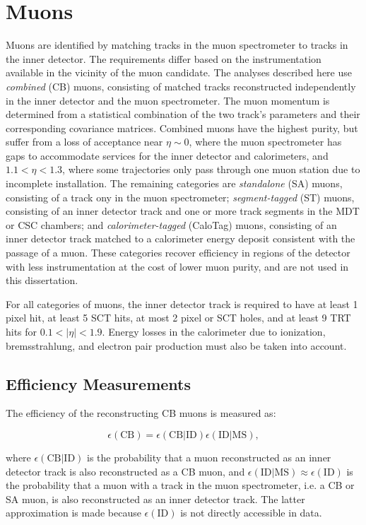 \section{Muons}\label{sec:event-reconstruction-muons}
Muons are identified by matching tracks in the muon spectrometer to tracks in the inner detector. The requirements differ based on the instrumentation available in the vicinity of the muon candidate. The analyses described here use \emph{combined} (CB) muons, consisting of matched tracks reconstructed independently in the inner detector and the muon spectrometer. The muon momentum is determined from a statistical combination of the two track's parameters and their corresponding covariance matrices. Combined muons have the highest purity, but suffer from a loss of acceptance near $\eta\sim 0$, where the muon spectrometer has gaps to accommodate services for the inner detector and calorimeters, and $1.1<\eta<1.3$, where some trajectories only pass through one muon station due to incomplete installation. The remaining categories are \emph{standalone} (SA) muons, consisting of a track ony in the muon spectrometer; \emph{segment-tagged} (ST) muons, consisting of an inner detector track and one or more track segments in the MDT or CSC chambers; and \emph{calorimeter-tagged} (CaloTag) muons, consisting of an inner detector track matched to a calorimeter energy deposit consistent with the passage of a muon. These categories recover efficiency in regions of the detector with less instrumentation at the cost of lower muon purity, and are not used in this dissertation. 

For all categories of muons, the inner detector track is required to have at least 1 pixel hit, at least 5 SCT hits, at most 2 pixel or SCT holes, and at least 9 TRT hits for $0.1<|\eta|<1.9$. Energy losses in the calorimeter due to ionization, bremsstrahlung, and electron pair production must also be taken into account. 

\subsection{Efficiency Measurements}\label{sec:reco-muon-efficiency}
The efficiency of the reconstructing CB muons is measured as:

\begin{equation}
	\epsilon(\mathrm{CB}) = \epsilon(\mathrm{CB}|\mathrm{ID}) \epsilon(\mathrm{ID}|\mathrm{MS}),
\end{equation}

where $\epsilon(\mathrm{CB}|\mathrm{ID})$ is the probability that a muon reconstructed as an inner detector track is also reconstructed as a CB muon, and $\epsilon(\mathrm{ID}|\mathrm{MS})\approx \epsilon(\mathrm{ID})$ is the probability that a muon with a track in the muon spectrometer, i.e. a CB or SA muon, is also reconstructed as an inner detector track. The latter approximation is made because $\epsilon(\mathrm{ID})$ is not directly accessible in data. 

